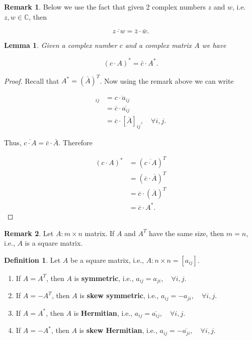 \documentclass[12pt]{article}
\newtheorem*{lemma}{Lemma}
\theoremstyle{definition}
\newtheorem*{definition}{Definition}
\newtheorem*{remark}{Remark}
\begin{document}
\begin{enumerate}[label=\Roman*)]
\begin{remark}
Below we use the fact that given 2 complex numbers $z$ and $w$, i.e.
$z, w \in \mathbb{C}$, then

$$ \overline{z \cdot w} = \bar{z} \cdot \bar{w}. $$
\end{remark}

\begin{lemma}
Given a complex number $c$ and a complex matrix $A$ we have

$$ (c \cdot A)^* = \bar{c} \cdot A^*. $$
\end{lemma}

\begin{proof}
Recall that $A^* = (\bar{A})^T$. Now using the remark above we can write

\begin{align*}
[\overline{c \cdot A}]_{ij} &= \overline{c \cdot a_{ij}} \\
&= \overline{c} \cdot \overline{a_{ij}} \\
&= \overline{c} \cdot [\overline{A}]_{ij}, \quad \forall i, j. 
\end{align*}

Thus, $\overline{c \cdot A} = \bar{c} \cdot \bar{A}$. Therefore

\begin{align*}
(c \cdot A)^* &= (\overline{c \cdot A})^T \\
&= (\overline{c} \cdot \overline{A})^T \\
&= \overline{c} \cdot (\overline{A})^T \\
&= \overline{c} \cdot A^*.
\end{align*}
\end{proof}

\end{enumerate}


\begin{remark}
Let $A : m \times n$ matrix. If $A$ and $A^T$ have the same size, then $m = n$,
i.e., $A$ is a square matrix.
\end{remark}

\begin{definition}
Let $A$ be a square matrix, i.e., $A : n \times n = [a_{ij}]$.

\begin{enumerate}
\item If $A = A^T$, then $A$ is \textbf{symmetric}, i.e., 
$a_{ij} = a_{ji}, \quad \forall i, j$.

\item If $A = -A^T$, then $A$ is \textbf{skew symmetric}, i.e.,
$a_{ij} = -a_{ji}, \quad \forall i, j$.

\item If $A = A^*$, then $A$ is \textbf{Hermitian}, i.e., 
$a_{ij} = \overline{a_{ij}}, \quad \forall i, j$.

\item If $A = -A^*$, then $A$ is \textbf{skew Hermitian}, i.e.,
$a_{ij} = -\overline{a_{ji}}, \quad \forall i, j$.
\end{enumerate}

\end{definition}
\end{document}
